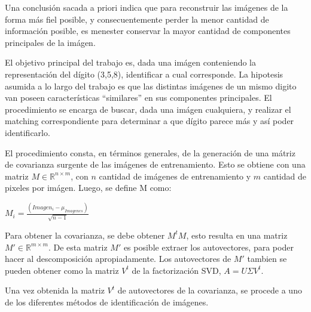 Una conclusi\'on sacada a priori indica que para reconstruir las im\'agenes de la forma m\'as fiel posible,
y consecuentemente perder la menor cantidad de informaci\'on posible, es menester conservar la mayor cantidad
de componentes principales de la im\'agen.

El objetivo principal del trabajo es, dada una im\'agen conteniendo la representaci\'on del d\'igito (3,5,8),
identificar a cual corresponde. La hipotesis asumida a lo largo del trabajo es que las distintas im\'agenes
de un mismo digito van poseen caracter\'isticas ``similares'' en sus componentes principales.
El procedimiento se encarga de buscar, dada una im\'agen cualquiera, y realizar el matching correspondiente
para determinar a que d\'igito parece m\'as y as\'i poder identificarlo.

El procedimiento consta, en t\'erminos generales, de la generaci\'on de una m\'atriz de covarianza surgente
de las im\'agenes de entrenamiento. Esto se obtiene con una matriz $M \in \mathbb{R}^{n \times m}$, con $n$ cantidad
de im\'agenes de entrenamiento y $m$ cantidad de pixeles por im\'agen. Luego, se define M como:

$M_i = \frac{(Imagen_i - \mu_{Imagenes})}{\sqrt{n-1}}$

Para obtener la covarianza, se debe obtener $M^t M$, esto resulta en una matriz $M' \in \mathbb{R}^{m \times m}$.
De esta matriz $M'$ es posible extraer los autovectores, para poder hacer al descomposici\'on apropiadamente.
Los autovectores de $M'$ tambien se pueden obtener como la matriz $V^t$ de la factorizaci\'on SVD, $A=U\Sigma V^t$.

Una vez obtenida la matriz $V^t$ de autovectores de la covarianza, se procede a uno de los diferentes m\'etodos de
identificaci\'on de im\'agenes.
